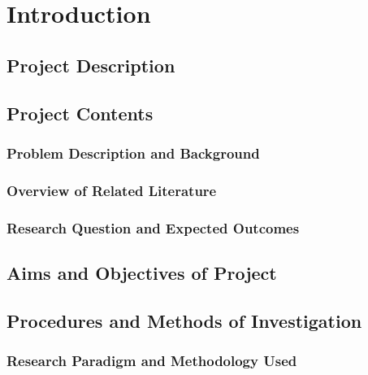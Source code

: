 
\chapter{Introduction} %

\label{Chapter1} %


\newcommand{\keyword}[1]{\textbf{#1}}
\newcommand{\tabhead}[1]{\textbf{#1}}
\newcommand{\code}[1]{\texttt{#1}}
\newcommand{\file}[1]{\texttt{\bfseries#1}}
\newcommand{\option}[1]{\texttt{\itshape#1}}


\section{Project Description}

\section{Project Contents}
\subsection{Problem Description and Background}
\subsection{Overview of Related Literature}
\subsection{Research Question and Expected Outcomes}

\section{Aims and Objectives of Project}

\section{Procedures and Methods of Investigation}
\subsection{Research Paradigm and Methodology Used}
